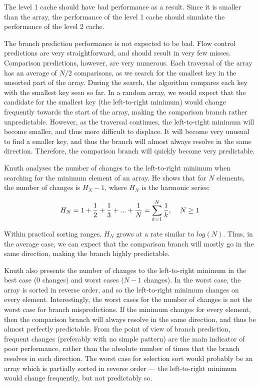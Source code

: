 The level 1 cache should have bad performance as a result. Since it is smaller
than the array, the performance of the level 1 cache should simulate the
performance of the level 2 cache.

\label{selection branches harmonics}
The branch prediction performance is not expected to be bad. Flow
control predictions are very straightforward, and should result in
very few misses.  Comparison predictions, however, are very
numerous. Each traversal of the array has an average of $N/2$
comparisons, as we search for the smallest key in the unsorted part of
the array. During the search, the algorithm compares each key with the
smallest key seen so far. In a random array, we would expect that the
candidate for the smallest key (the left-to-right minimum) would
change frequently towards the start of the array, making the
comparison branch rather unpredictable. However, as the traversal
continues, the left-to-right minimum will become smaller, and thus
more difficult to displace. It will become very unusual to find a
smaller key, and thus the branch will almost always resolve in the
same direction.  Therefore, the comparison branch will quickly become
very predictable.

Knuth \cite{Knuth97} analyses the number of changes to the
left-to-right minimum when searching for the minimum element of an
array. He shows that for $N$ elements, the number of changes is $H_N -
1$, where $H_N$ is the harmonic series:

$$H_N = 1 + \frac{1}{2} + \frac{1}{3} + ... + \frac{1}{N} =  \sum_{k=1}^{N}
\frac{1}{k},  \hspace{0.4cm}  N \geq 1$$

Within practical sorting ranges, $H_N$ grows at a rate similar to
$log(N)$. Thus, in the average case, we can expect that the comparison
branch will mostly go in the same direction, making the branch highly
predictable.

Knuth also presents the number of changes to the left-to-right minimum
in the best case (0 changes) and worst cases ($N-1$ changes).  In the
worst case, the array is sorted in reverse order, and so the
left-to-right minimum changes on every element. Interestingly, the
worst cases for the number of changes is not the worst case for branch
mispredictions. If the minimum changes for every element, then the
comparison branch will always resolve in the same direction, and thus
be almost perfectly predictable.  From the point of view of branch
prediction, frequent changes (preferably with no simple pattern) are
the main indicator of poor performance, rather than the absolute
number of times that the branch resolves in each direction. The worst
case for selection sort would probably be an array which is partially
sorted in reverse order --- the left-to-right minimum would change
frequently, but not predictably so.


